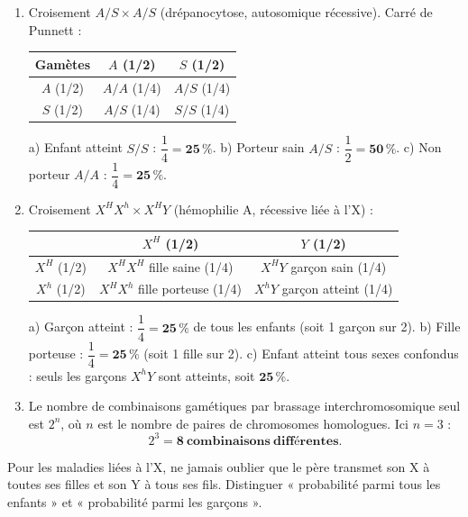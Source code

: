 \documentclass[11pt]{article}
\begin{document}
\begin{corrige}
\begin{enumerate}
    \item Croisement $A/S \times A/S$ (drépanocytose, autosomique récessive). Carré de Punnett :
    \begin{center}
    \begin{tabular}{|c|c|c|}\hline
    \rowcolor{popblueL} Gamètes & $A$ (1/2) & $S$ (1/2) \\ \hline
    $A$ (1/2) & $A/A$ (1/4) & $A/S$ (1/4) \\ \hline
    $S$ (1/2) & $A/S$ (1/4) & $S/S$ (1/4) \\ \hline
    \end{tabular}
    \end{center}
    a) Enfant atteint $S/S$ : $\dfrac{1}{4} = \mathbf{25\,\%}$. \quad b) Porteur sain $A/S$ : $\dfrac{1}{2} = \mathbf{50\,\%}$. \quad c) Non porteur $A/A$ : $\dfrac{1}{4} = \mathbf{25\,\%}$.
    \item Croisement $X^H X^h \times X^H Y$ (hémophilie A, récessive liée à l'X) :
    \begin{center}
    \begin{tabular}{|c|c|c|}\hline
    \rowcolor{popblueL} & $X^H$ (1/2) & $Y$ (1/2) \\ \hline
    $X^H$ (1/2) & $X^H X^H$ fille saine (1/4) & $X^H Y$ garçon sain (1/4) \\ \hline
    $X^h$ (1/2) & $X^H X^h$ fille porteuse (1/4) & $X^h Y$ garçon atteint (1/4) \\ \hline
    \end{tabular}
    \end{center}
    a) Garçon atteint : $\dfrac{1}{4} = \mathbf{25\,\%}$ de tous les enfants (soit 1 garçon sur 2). \quad b) Fille porteuse : $\dfrac{1}{4} = \mathbf{25\,\%}$ (soit 1 fille sur 2). \quad c) Enfant atteint tous sexes confondus : seuls les garçons $X^h Y$ sont atteints, soit $\mathbf{25\,\%}$.
    \item Le nombre de combinaisons gamétiques par brassage interchromosomique seul est $2^n$, où $n$ est le nombre de paires de chromosomes homologues. Ici $n=3$ :
    \[ 2^3 = \mathbf{8\ combinaisons\ différentes}. \]
\end{enumerate}
\end{corrige}

\begin{attention}
Pour les maladies liées à l'X, ne jamais oublier que le père transmet son X à toutes ses filles et son Y à tous ses fils. Distinguer « probabilité parmi tous les enfants » et « probabilité parmi les garçons ».
\end{attention}
\end{document}
